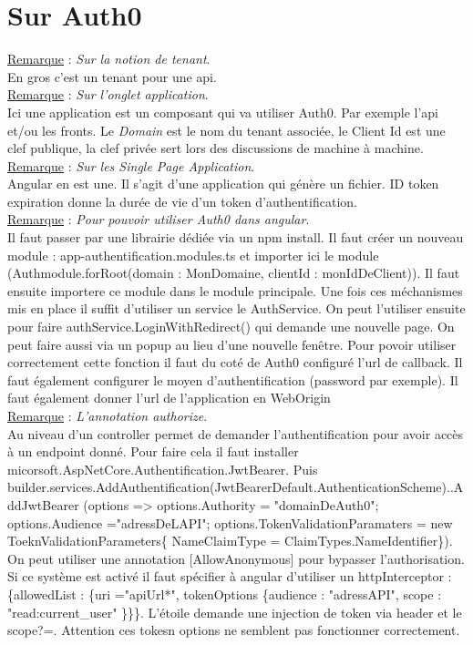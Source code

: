 \documentclass[a4paper,12pt,twoside]{article}
\newcommand{\rem}[2]{\noindent\underline{Remarque} : \textit{#1}.\\ \indent #2}
\begin{document}
\section{Sur Auth0}

\rem{Sur la notion de tenant}{En gros c'est un tenant pour une api.}\\

\rem{Sur l'onglet application}{Ici une application est un composant qui va utiliser Auth0. Par exemple l'api et/ou les fronts. Le \textit{Domain} est le nom du tenant associée, le Client Id est une clef publique, la clef privée sert lors des discussions de machine à machine.}\\

\rem{Sur les Single Page Application}{Angular en est une. Il s'agit d'une application qui génère un fichier. ID token expiration donne la durée de vie d'un token d'authentification.}\\

\rem{Pour pouvoir utiliser Auth0 dans angular}{Il faut passer par une librairie dédiée via un npm install. Il faut créer un nouveau module : app-authentification.modules.ts et importer ici le module (Authmodule.forRoot(domain : MonDomaine, clientId : monIdDeClient)). Il faut ensuite importere ce module dans le module principale. Une fois ces méchanismes mis en place il suffit d'utiliser un service le AuthService. On peut l'utiliser ensuite pour faire authService.LoginWithRedirect() qui demande une nouvelle page. On peut faire aussi via un popup au lieu d'une nouvelle fenêtre. Pour povoir utiliser correctement cette fonction il faut du coté de Auth0 configuré l'url de callback. Il faut également configurer le moyen d'authentification (password par exemple). Il faut également donner l'url de l'application en WebOrigin}\\

\rem{L'annotation authorize}{Au niveau d'un controller permet de demander l'authentification pour avoir accès à un endpoint donné. Pour faire cela il faut installer micorsoft.AspNetCore.Authentification.JwtBearer. Puis builder.services.AddAuthentification(JwtBearerDefault.AuthenticationScheme)..AddJwtBearer (options => options.Authority = "domainDeAuth0"; options.Audience ="adressDeLAPI"; options.TokenValidationParamaters = new ToeknValidationParameters\{ NameClaimType = ClaimTypes.NameIdentifier\}). On peut utiliser une annotation [AllowAnonymous] pour bypasser l'authorisation. Si ce système est activé il faut spécifier à angular d'utiliser un httpInterceptor : \{allowedList : \{uri ="apiUrl*", tokenOptions \{audience : "adressAPI", scope : "read:current_user" \}\}\}. L'étoile demande une injection de token via header et le scope?=. Attention ces tokesn options ne semblent pas fonctionner correctement. }\\
\end{document}
